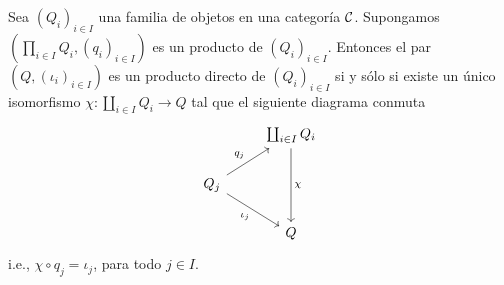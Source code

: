 \begin{prop}
\label{unicidad coproducto}
    Sea $(Q_i)_{i\in I}$ una familia de objetos en una categoría $\mathcal{C}$. Supongamos $(\prod_{i\in I}Q_i,(q_{i})_{i\in I})$ es un producto de $(Q_i)_{i\in I}$.
    Entonces el par $(Q,(\iota_i)_{i\in I})$
    es un producto directo de $(Q_i)_{i\in I}$ si y s\'olo si existe un único isomorfismo $\chi:\coprod_{i\in I}Q_i\to Q$ tal que el siguiente diagrama conmuta
   \[
\begin{tikzcd}[]
 &
  \coprod_{i\in I}Q_i \arrow[dd,"\chi"] \\
  Q_j\arrow[ur,"q_j"] \arrow[dr,"\iota_j"'] & \\
  & Q
\end{tikzcd}
\]    
i.e., $\chi\circ q_j=\iota_j$, para todo $j\in I.$ 
\end{prop}
    
